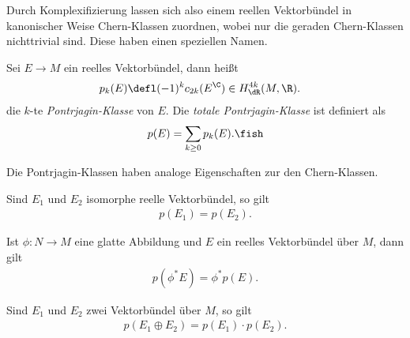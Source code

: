 \documentclass[%
	paper=a5,%
	fleqn,%
	DIV=18,%
	BCOR=0mm,
	fontsize=11pt,
	titlepage=false,%
	bibliography=totoc,
	DIV=18,%
	twoside=true,
	pdftitle=Riemannsche Geometrie,
	pdfauthor=Uwe Semmelmann,
	numbers=noendperiod]%
	{scrbook}
\begin{document}
Durch Komplexifizierung lassen sich also einem reellen Vektorbündel in kanonischer Weise Chern-Klassen zuordnen, wobei nur die geraden Chern-Klassen nichttrivial sind. Diese haben einen speziellen Namen.

\begin{defn}
Sei $E\to M$ ein reelles Vektorbündel, dann heißt
\begin{align*}
p_{k}(E) &\defl (-1)^k c_{2k}(E^\C) \in H_{\dR}^{4k}(M,\R).
\end{align*}
die $k$-te \emph{Pontrjagin-Klasse} von $E$. Die \emph{totale Pontrjagin-Klasse} ist definiert als
\begin{align*}
p(E) = \sum_{k\ge 0} p_{k}(E).\fish
\end{align*}
\end{defn}

Die Pontrjagin-Klassen haben analoge Eigenschaften zur den Chern-Klassen.

\begin{prop}
\begin{propenum}
\item Sind $E_{1}$ und $E_{2}$ isomorphe reelle Vektorbündel, so gilt
\begin{align*}
p(E_{1}) = p(E_{2}).
\end{align*}
\item Ist $\phi\colon N\to M$ eine glatte Abbildung und $E$ ein reelles Vektorbündel über $M$, dann gilt
\begin{align*}
p(\phi^* E) = \phi^* p(E).
\end{align*}
\item Sind $E_{1}$ und $E_{2}$ zwei Vektorbündel über $M$, so gilt
\begin{align*}
p(E_{1}\oplus E_{2}) = p(E_{1})\cdot p(E_{2}).
\end{align*}
\end{propenum}
\end{prop}
\end{document}
